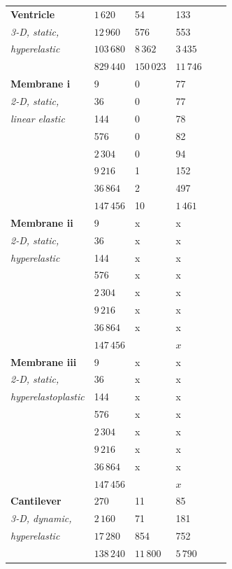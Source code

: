 \documentclass[sn-mathphys,Numbered]{sn-jnl}%
\begin{document}
\begin{table}[!htb]
\begin{tabular}{ll|ll|ll}
			\hline
			\textbf{Ventricle} & $1\,620$ & 54 & 133 & & \\
			\emph{3-D, static,}& $12\,960$ & 576 & 553 & & \\
			\emph{hyperelastic} & $103\,680$ & $8\,362$ & $3\,435$ & & \\
				& $829\,440$ & $150\,023$ & $11\,746$ & & \\
			\hline
			\textbf{Membrane i} & 9 & 0 & 77 & & \\
			\emph{2-D, static,}& 36 & 0 & 77  & & \\
			\emph{linear elastic}& 144 & 0 & 78  & & \\
				& 576 & 0 & 82 & & \\
				& $2\,304$ & 0 & 94 & & \\
				& $9\,216$ & 1 & 152 & & \\
				& $36\,864$ & 2& 497 & & \\
				& $147\,456$ & 10& $1\,461$ & & \\
			\hline
			\textbf{Membrane ii} & 9 & x & x & & \\
			\emph{2-D, static,} & 36 & x & x & & \\
			\emph{hyperelastic} & 144 & x & x & & \\
				& 576 & x & x & & \\
				& $2\,304$ & x & x & & \\
				& $9\,216$ & x & x & & \\
				& $36\,864$ & x & x & & \\
				& $147\,456$ & & $x$ & & \\
			\hline
			\textbf{Membrane iii} & 9 & x & x & & \\
			\emph{2-D, static,} & 36 & x & x & & \\
			\emph{hyperelastoplastic}& 144 & x & x & & \\
				& 576 & x & x & & \\
				& $2\,304$ & x & x & & \\
				& $9\,216$ & x & x & & \\
				& $36\,864$ & x & x & & \\
				& $147\,456$ & & $x$ & & \\
			\hline
			\textbf{Cantilever} & $270$ & 11 & 85 & & \\
			\emph{3-D, dynamic,} & $2\,160$ & 71 & 181 & & \\
			\emph{hyperelastic}& $17\,280$ & 854 & 752 & & \\
				& $138\,240$ & $11\,800$ & $5\,790$ & & \\

\end{tabular}
\end{table}
\end{document}
